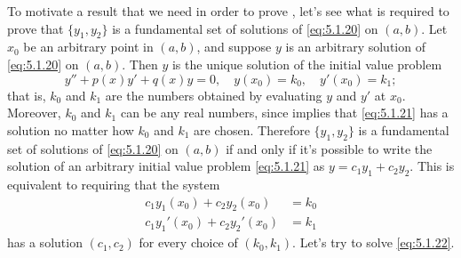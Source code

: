 
To motivate a result that we need in order to prove
,
 let's see what is required to prove that  $\{y_1,y_2\}$
is a  fundamental set of solutions of \eqref{eq:5.1.20} on  $(a,b)$.
Let $x_0$ be an arbitrary point in  $(a,b)$, and
suppose  $y$ is an arbitrary  solution of
\eqref{eq:5.1.20} on  $(a,b)$.  Then $y$ is the unique solution of the
initial value problem
\begin{equation}\label{eq:5.1.21}
y''+p(x)y'+q(x)y=0,\quad y(x_0)=k_0,\quad y'(x_0)=k_1;
\end{equation}
that is, $k_0$ and $k_1$ are the numbers obtained by evaluating $y$
and $y'$ at $x_0$. Moreover, $k_0$ and $k_1$ can be any real numbers,
since  implies that \eqref{eq:5.1.21} has a
solution no matter how $k_0$ and $k_1$ are chosen.
Therefore  $\{y_1,y_2\}$ is a fundamental set of solutions of
\eqref{eq:5.1.20} on $(a,b)$ if and only if it's possible to write the
solution of an arbitrary initial value problem \eqref{eq:5.1.21}
as $y=c_1y_1+c_2y_2$. This is equivalent to requiring that the
system
\begin{equation}\label{eq:5.1.22}
\begin{aligned}
c_1y_1(x_0)+c_2y_2(x_0)&=k_0\\
c_1y_1'(x_0)+c_2y_2'(x_0)&=k_1
\end{aligned}
\end{equation}
has  a solution $(c_1,c_2)$ for every choice of $(k_0,k_1)$.
Let's try to solve \eqref{eq:5.1.22}.

